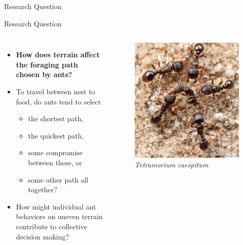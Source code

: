 \begin{subsection}{Research Question}

\begin{frame}{Research Question}
\begin{columns}[T,onlytextwidth]
\begin{itemize}
	\item \textbf{How does terrain affect the foraging path chosen by ants?}
	\item To travel between nest to food, do ants tend to select
    	\begin{itemize}
        	\item the shortest path,
            \item the quickest path,
            \item some compromise between these, or
            \item some other path all together?
          \end{itemize}
    \item How might individual ant behaviors on uneven terrain contribute to collective decision making?
\end{itemize}
\begin{figure}
        \includegraphics[width=\textwidth]{images/ant_battle2-XL_reduced}
        \caption{\textit{Tetramorium caespitum} \scriptsize{\cite{alexander_wild_ant_battle2-xl.jpg_????}}}
\end{figure}
\end{columns}
\end{frame}

\end{subsection}